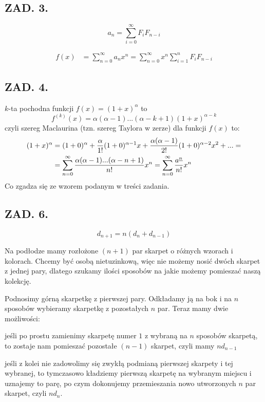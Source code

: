 \documentclass{article}[13pt]
\begin{document}
\subsection*{ZAD. 3.}
$$a_n=\sum\limits_{i=0}^\infty F_iF_{n-i}$$

\begin{align*}
    f(x)&=\sum\limits_{n=0}^\infty a_nx^n=\sum\limits_{n=0}^\infty x^n\sum\limits_{i=1}^n F_iF_{n-i}
\end{align*}

\subsection*{ZAD. 4.}

$k$-ta pochodna funkcji $f(x)=(1+x)^\alpha$ to
$$f^{(k)}(x)=\alpha(\alpha-1)...(\alpha-k+1)(1+x)^{\alpha-k}$$
czyli szereg Maclaurina (tzn. szereg Taylora w zerze) dla funkcji $f(x)$ to:
\begin{align*}
    (1+x)^\alpha&=(1+0)^\alpha+{\alpha\over 1!}(1+0)^{\alpha-1}x+{\alpha(\alpha-1)\over 2!}(1+0)^{\alpha-2}x^2+...=\\
    &=\sum\limits_{n=0}^\infty {\alpha(\alpha-1)...(\alpha-n+1)\over n!}x^n=\sum\limits_{n=0}^\infty {a^{\underline{n}}\over n!}x^n
\end{align*}
Co zgadza się ze wzorem podanym w treści zadania.

\subsection*{ZAD. 6.}

$$d_{n+1}=n(d_n+d_{n-1})$$

Na podłodze mamy rozłożone $(n+1)$ par skarpet o różnych wzorach i kolorach. Chcemy być osobą nietuzinkową, więc nie możemy nosić dwóch skarpet z jednej pary, dlatego szukamy ilości sposobów na jakie możemy pomieszać naszą kolekcję. 

Podnosimy górną skarpetkę z pierwszej pary. Odkładamy ją na bok i na $n$ sposobów wybieramy skarpetkę z pozostałych $n$ par. Teraz mamy dwie możliwości:

\point jeśli po prostu zamienimy skarpetę numer $1$ z wybraną na $n$ sposobów skarpetą, to zostaje nam pomieszać pozostałe $(n-1)$ skarpet, czyli mamy $nd_{n-1}$

\point jeśli z kolei nie zadowolimy się zwykłą podmianą pierwszej skarpety i tej wybranej, to tymczasowo kładziemy pierwszą skarpetę na wybranym miejscu i uznajemy to parę, po czym dokonujemy przemieszania nowo utworzonych $n$ par skarpet, czyli $nd_n$.
\medskip
\end{document}
